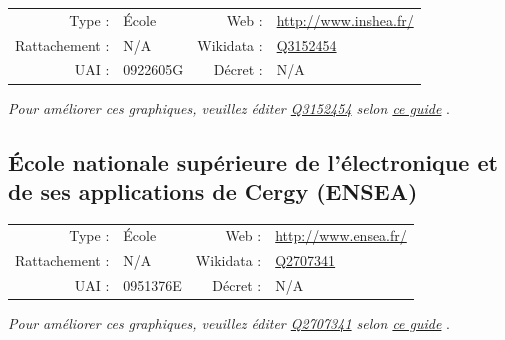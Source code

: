 \documentclass[11pt,french,landscape]{article}
\begin{document}
\begin{tabular*}{0.45\textwidth}{rp{2cm}rl}  
\hline  
Type : & École & Web : &\href{http://www.inshea.fr/}{http://www.inshea.fr/} \\  
Rattachement : & N/A & Wikidata : & \href{https://www.wikidata.org/entity/Q3152454}{Q3152454} \\  
UAI : & 0922605G & Décret : & N/A \\  
\hline  
\end{tabular*}

\textit{\scriptsize Pour améliorer ces graphiques, veuillez éditer \href{https://www.wikidata.org/entity/Q3152454}{Q3152454}  selon \href{https://github.com/cpesr/wikidataESR/blob/master/Rmd/wikidataESR.md}{ce guide}}
.


\newpage

\hypertarget{uxe9cole-nationale-supuxe9rieure-de-luxe9lectronique-et-de-ses-applications-de-cergy-ensea}{%
\subsection{École nationale supérieure de l'électronique et de ses
applications de Cergy
(ENSEA)}\label{uxe9cole-nationale-supuxe9rieure-de-luxe9lectronique-et-de-ses-applications-de-cergy-ensea}}

\begin{tabular*}{0.45\textwidth}{rp{2cm}rl}  
\hline  
Type : & École & Web : &\href{http://www.ensea.fr/}{http://www.ensea.fr/} \\  
Rattachement : & N/A & Wikidata : & \href{https://www.wikidata.org/entity/Q2707341}{Q2707341} \\  
UAI : & 0951376E & Décret : & N/A \\  
\hline  
\end{tabular*}

\textit{\scriptsize Pour améliorer ces graphiques, veuillez éditer \href{https://www.wikidata.org/entity/Q2707341}{Q2707341}  selon \href{https://github.com/cpesr/wikidataESR/blob/master/Rmd/wikidataESR.md}{ce guide}}
.


\newpage

\vspace*{5cm}
\end{document}
